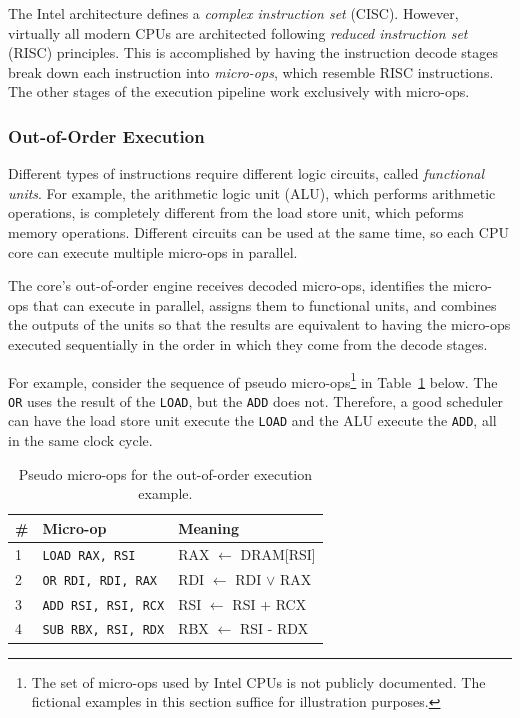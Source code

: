 
The Intel architecture defines a \textit{complex instruction set} (CISC).
However, virtually all modern CPUs are architected following \textit{reduced
instruction set} (RISC) principles. This is accomplished by having the
instruction decode stages break down each instruction into \textit{micro-ops},
which resemble RISC instructions. The other stages of the execution pipeline
work exclusively with micro-ops.


\subsubsection{Out-of-Order Execution}


Different types of instructions require different logic circuits, called
\textit{functional units}. For example, the arithmetic logic unit (ALU), which
performs arithmetic operations, is completely different from the load store
unit, which peforms memory operations. Different circuits can be used at the
same time, so each CPU core can execute multiple micro-ops in parallel.

The core's out-of-order engine receives decoded micro-ops, identifies the
micro-ops that can execute in parallel, assigns them to functional units, and
combines the outputs of the units so that the results are equivalent to having
the micro-ops executed sequentially in the order in which they come from the
decode stages.

For example, consider the sequence of pseudo micro-ops\footnote{The set of
micro-ops used by Intel CPUs is not publicly documented. The fictional examples
in this section suffice for illustration purposes.} in
Table~\ref{fig:out_of_order_micro_ops} below. The \texttt{OR} uses the result
of the \texttt{LOAD}, but the \texttt{ADD} does not. Therefore, a good
scheduler can have the load store unit execute the \texttt{LOAD} and the ALU
execute the \texttt{ADD}, all in the same clock cycle.

\begin{table}[hbt]
  \centering
  \begin{tabular}{| l | l | l |}
  \hline
  \textbf{\#} & \textbf{Micro-op} & \textbf{Meaning}\\
  \hline
  1 & \texttt{LOAD RAX, RSI} & RAX $\leftarrow$ DRAM[RSI]\\
  \hline
  2 & \texttt{OR RDI, RDI, RAX} & RDI $\leftarrow$ RDI $\lor$ RAX\\
  \hline
  3 & \texttt{ADD RSI, RSI, RCX} & RSI $\leftarrow$ RSI + RCX\\
  \hline
  4 & \texttt{SUB RBX, RSI, RDX} & RBX $\leftarrow$ RSI - RDX\\
  \hline
  \end{tabular}
  \caption{
    Pseudo micro-ops for the out-of-order execution example.
  }
  \label{fig:out_of_order_micro_ops}
\end{table}

